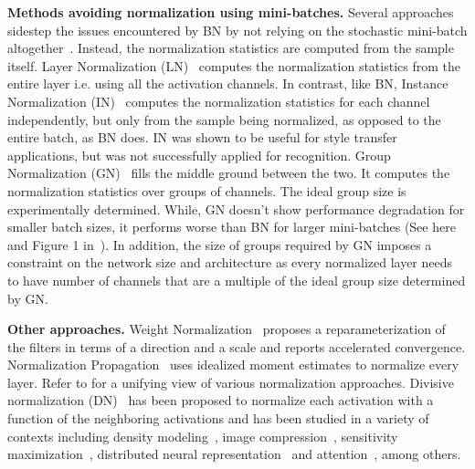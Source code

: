 \documentclass[10pt,twocolumn,letterpaper]{article}
\newcommand{\batchnorm}{BN}
\begin{document}
\medskip
\noindent
\textbf{Methods avoiding normalization using mini-batches.}
Several approaches sidestep the issues encountered by \batchnorm{} by not relying on the stochastic mini-batch altogether~\cite{layernorm, groupnorm, instancenorm}. Instead, the normalization statistics are computed from the sample itself. Layer Normalization (LN)~\cite{layernorm} computes the normalization statistics from the entire layer i.e. using all the activation channels. In contrast, like \batchnorm{}, Instance Normalization (IN)~\cite{instancenorm} computes the normalization statistics for each channel independently, but only from the sample being normalized, as opposed to the entire batch, as \batchnorm{} does. IN was shown to be useful for style transfer applications, but was not successfully applied for recognition. Group Normalization (GN)~\cite{groupnorm} fills the middle ground between the two. It computes the normalization statistics over groups of channels. The ideal group size is experimentally determined. While, GN doesn't show  performance degradation for smaller batch sizes, it performs worse than \batchnorm{} for larger mini-batches (See  here and Figure 1 in~\cite{groupnorm}). In addition, the size of groups required by GN imposes a constraint on the network size and architecture as every normalized layer needs to have number of channels that are a multiple of the ideal group size determined by GN.

\medskip
\noindent
\textbf{Other approaches.} Weight Normalization~\cite{salimans2016weight} proposes a reparameterization of the filters in terms of a direction and a scale and reports accelerated convergence. Normalization Propagation~\cite{arpit2016normalization} uses idealized moment estimates to normalize every layer. Refer to \citet{ren2016normalizing} for a unifying view of various normalization approaches.  Divisive normalization (DN)~\cite{bonds1989role,heeger1992normalization} has been proposed to normalize each activation with a function of the neighboring activations and has been studied in a variety of contexts including density modeling~\cite{balle2016density}, image compression~\cite{balle2017end, balle2018variational}, sensitivity maximization~\cite{carandini2012normalization}, distributed neural representation~\cite{simoncelli1998model} and attention~\cite{reynolds2009normalization}, among others.
\end{document}
